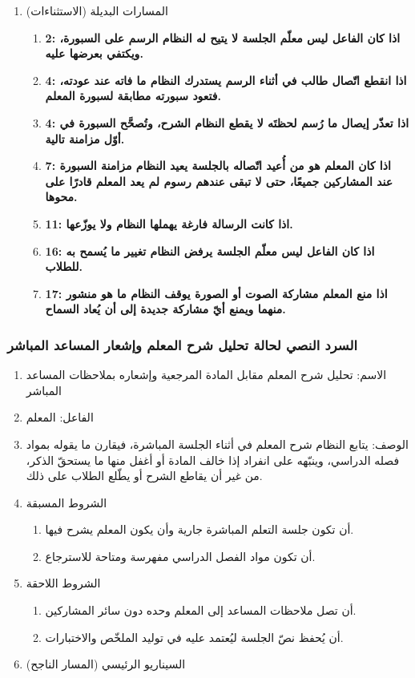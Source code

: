 \begin{enumerate}
  \item المسارات البديلة (الاستثناءات)
  \begin{enumerate}
    \item \textbf{2: اذا كان الفاعل ليس معلّم الجلسة لا يتيح له النظام الرسم على السبورة، ويكتفي بعرضها عليه. }
    \item \textbf{4: اذا انقطع اتّصال طالب في أثناء الرسم يستدرك النظام ما فاته عند عودته، فتعود سبورته مطابقة لسبورة المعلم. }
    \item \textbf{4: اذا تعذّر إيصال ما رُسم لحظتَه لا يقطع النظام الشرح، وتُصحَّح السبورة في أوّل مزامنة تالية. }
    \item \textbf{7: اذا كان المعلم هو من أُعيد اتّصاله بالجلسة يعيد النظام مزامنة السبورة عند المشاركين جميعًا، حتى لا تبقى عندهم رسوم لم يعد المعلم قادرًا على محوها. }
    \item \textbf{11: اذا كانت الرسالة فارغة يهملها النظام ولا يوزّعها. }
    \item \textbf{16: اذا كان الفاعل ليس معلّم الجلسة يرفض النظام تغيير ما يُسمح به للطلاب. }
    \item \textbf{17: اذا منع المعلم مشاركة الصوت أو الصورة يوقف النظام ما هو منشور منهما ويمنع أيّ مشاركة جديدة إلى أن يُعاد السماح.}
  \end{enumerate}
\end{enumerate}

\subsubsection{السرد النصي لحالة تحليل شرح المعلم وإشعار المساعد المباشر}
\label{subsubsec:uc-drift}

\begin{enumerate}
  \item الاسم: تحليل شرح المعلم مقابل المادة المرجعية وإشعاره بملاحظات المساعد المباشر
  \item الفاعل: المعلم
  \item الوصف: يتابع النظام شرح المعلم في أثناء الجلسة المباشرة، فيقارن ما يقوله بمواد فصله الدراسي، وينبّهه على انفراد إذا خالف المادة أو أغفل منها ما يستحقّ الذكر، من غير أن يقاطع الشرح أو يطّلع الطلاب على ذلك.
  \item الشروط المسبقة
  \begin{enumerate}
    \item أن تكون جلسة التعلم المباشرة جارية وأن يكون المعلم يشرح فيها.
    \item أن تكون مواد الفصل الدراسي مفهرسة ومتاحة للاسترجاع.
  \end{enumerate}
  \item الشروط اللاحقة
  \begin{enumerate}
    \item أن تصل ملاحظات المساعد إلى المعلم وحده دون سائر المشاركين.
    \item أن يُحفظ نصّ الجلسة ليُعتمد عليه في توليد الملخّص والاختبارات.
  \end{enumerate}
  \item السيناريو الرئيسي (المسار الناجح)
\end{enumerate}

